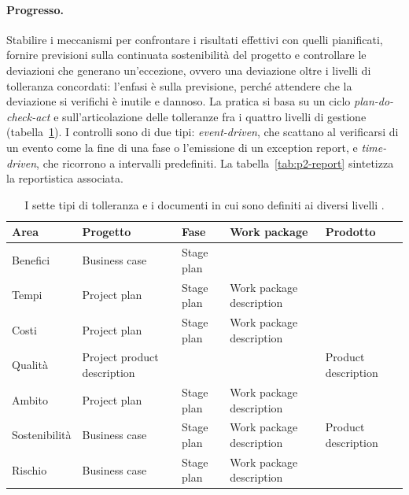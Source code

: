\paragraph{Progresso.} Stabilire i meccanismi per confrontare i risultati
effettivi con quelli pianificati, fornire previsioni sulla continuata
sostenibilit\`a del progetto e controllare le deviazioni che generano
un'eccezione, ovvero una
deviazione oltre i livelli di tolleranza concordati: l'enfasi \`e sulla
previsione, perch\'e attendere che la deviazione si verifichi \`e inutile e
dannoso.
La pratica si basa su un ciclo \emph{plan-do-check-act} e
sull'articolazione delle tolleranze fra i quattro livelli di gestione
(tabella~\ref{tab:p2-tolleranze}). I controlli sono di due tipi:
\emph{event-driven}, che scattano al verificarsi di un evento come la fine di
una fase o l'emissione di un exception report, e \emph{time-driven}, che
ricorrono a intervalli predefiniti. La tabella~\ref{tab:p2-report} sintetizza la
reportistica associata.

\begin{table}[htbp]
\centering
\small
\caption{I sette tipi di tolleranza e i documenti in cui sono definiti ai diversi livelli \cite{prince27}.}
\label{tab:p2-tolleranze}
\begin{tabularx}{\textwidth}{@{}lXXXX@{}}
\toprule
\textbf{Area} & \textbf{Progetto} & \textbf{Fase} & \textbf{Work package} & \textbf{Prodotto} \\
\midrule
Benefici & Business case & Stage plan &  &  \\
Tempi & Project plan & Stage plan & Work package description &  \\
Costi & Project plan & Stage plan & Work package description &  \\
Qualit\`a & Project product description &  &  & Product description \\
Ambito & Project plan & Stage plan & Work package description &  \\
Sostenibilit\`a & Business case & Stage plan & Work package description & Product description \\
Rischio & Business case & Stage plan & Work package description &  \\
\bottomrule
\end{tabularx}
\end{table}

